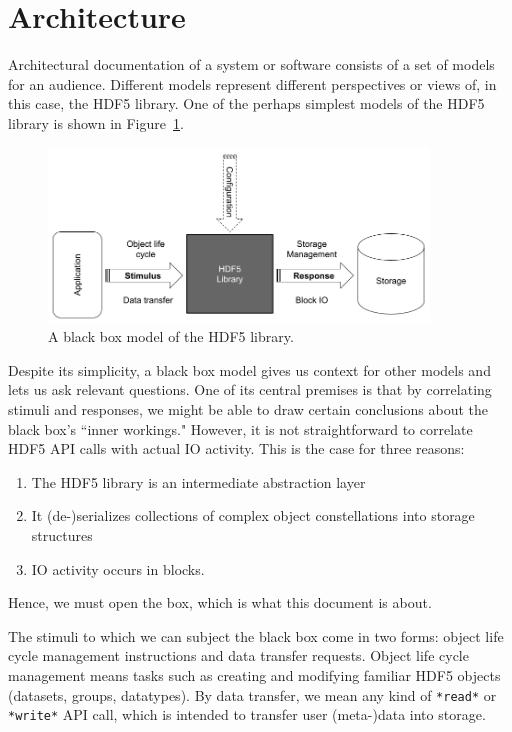 \section{Architecture}

Architectural documentation of a system or software consists of a set of models for an audience. Different models represent different perspectives or views of, in this case, the HDF5 library. One of the perhaps simplest models of the HDF5 library is shown in Figure~\ref{fig:blackbox}.

\begin{figure}[ht]
\centering
\includegraphics[width=0.9\textwidth]{images/Black box.png}
\caption{A black box model of the HDF5 library.}
\label{fig:blackbox}
\end{figure}

Despite its simplicity, a black box model gives us context for other models and lets us ask relevant questions. One of its central premises is that by correlating stimuli and responses, we might be able to draw certain conclusions about the black box's ``inner workings." However, it is not straightforward to correlate HDF5 API calls with actual IO activity. This is the case for three reasons:
\begin{enumerate}
    \item The HDF5 library is an intermediate abstraction layer
    \item It (de-)serializes collections of complex object constellations into storage structures
    \item IO activity occurs in blocks.
\end{enumerate}
Hence, we must open the box, which is what this document is about.

The stimuli to which we can subject the black box come in two forms: object life cycle management instructions and data transfer requests. Object life cycle management means tasks such as creating and modifying familiar HDF5 objects (datasets, groups, datatypes). By data transfer, we mean any kind of \texttt{*read*} or \texttt{*write*} API call, which is intended to transfer user (meta-)data into storage.


